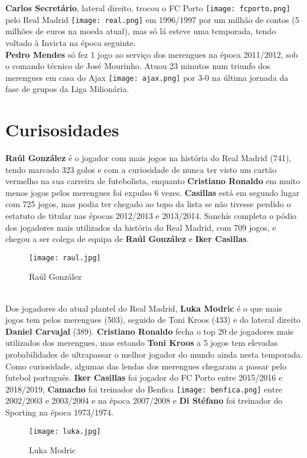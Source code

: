 \documentclass{report}
\begin{document}
\textbf{Carlos Secretário}, lateral direito, trocou o FC Porto \texttt{[image: fcporto.png]} pelo Real Madrid \texttt{[image: real.png]} em 1996/1997 por um milhão de contos (5 milhões de euros na moeda atual), mas só lá esteve uma temporada, tendo voltado à Invicta na época seguinte.
\\

\textbf{Pedro Mendes} só fez 1 jogo ao serviço dos merengues na época 2011/2012, sob o comando técnico de José Mourinho. Atuou 23 minutos num triunfo dos merengues em casa do Ajax \texttt{[image: ajax.png]} por 3-0 na última jornada da fase de grupos da Liga Milionária. 

\section{Curisosidades}
\textbf{Raúl González} é o jogador com mais jogos na história do Real Madrid (741), tendo marcado 323 golos e com a curiosidade de nunca ter visto um cartão vermelho na sua carreira de futebolista, enquanto \textbf{Cristiano Ronaldo} em muito menos jogos pelos merengues foi expulso 6 vezes. \textbf{Casillas} está em segundo lugar com 725 jogos, mas podia ter chegado ao topo da lista se não tivesse perdido o estatuto de titular nas épocas 2012/2013 e 2013/2014. Sanchís completa o pódio dos jogadores mais utilizados da história do Real Madrid, com 709 jogos, e chegou a ser colega de equipa de \textbf{Raúl González} e \textbf{Iker Casillas}.
\begin{figure}[h]
    \centering
    \texttt{[image: raul.jpg]}
    \caption{Raúl González}
    \label{fig:raul}
\end{figure}
\\

Dos jogadores do atual plantel do Real Madrid, \textbf{Luka Modric} é o que mais jogos tem pelos merengues (503), seguido de Toni Kroos (433) e do lateral direito \textbf{Daniel Carvajal} (389). \textbf{Cristiano Ronaldo} fecha o top 20 de jogadores mais utilizados dos merengues, mas estando \textbf{Toni Kroos} a 5 jogos tem elevadas probabilidades de ultrapassar o melhor jogador do mundo ainda nesta temporada.
Como curiosidade, algumas das lendas dos merengues chegaram a passar pelo futebol português. \textbf{Iker Casillas} foi jogador do FC Porto entre 2015/2016 e 2018/2019, \textbf{Camacho} foi treinador do Benfica \texttt{[image: benfica.png]} entre 2002/2003 e 2003/2004 e na época 2007/2008 e \textbf{Di Stéfano} foi treinador do Sporting na época 1973/1974.
\begin{figure}[h]
    \centering
    \texttt{[image: luka.jpg]}
    \caption{Luka Modric}
    \label{fig:luka}
\end{figure}
\\
\end{document}
